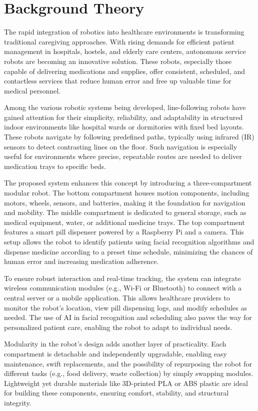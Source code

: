 \section{Background Theory}
The rapid integration of robotics into healthcare environments is transforming traditional caregiving approaches. With rising demands for efficient patient management in hospitals, hostels, and elderly care centers, autonomous service robots are becoming an innovative solution. These robots, especially those capable of delivering medications and supplies, offer consistent, scheduled, and contactless services that reduce human error and free up valuable time for medical personnel.

Among the various robotic systems being developed, line-following robots have gained attention for their simplicity, reliability, and adaptability in structured indoor environments like hospital wards or dormitories with fixed bed layouts. These robots navigate by following predefined paths, typically using infrared (IR) sensors to detect contrasting lines on the floor. Such navigation is especially useful for environments where precise, repeatable routes are needed to deliver medication trays to specific beds.

The proposed system enhances this concept by introducing a three-compartment modular robot. The bottom compartment houses motion components, including motors, wheels, sensors, and batteries, making it the foundation for navigation and mobility. The middle compartment is dedicated to general storage, such as medical equipment, water, or additional medicine trays. The top compartment features a smart pill dispenser powered by a Raspberry Pi and a camera. This setup allows the robot to identify patients using facial recognition algorithms and dispense medicine according to a preset time schedule, minimizing the chances of human error and increasing medication adherence.

To ensure robust interaction and real-time tracking, the system can integrate wireless communication modules (e.g., Wi-Fi or Bluetooth) to connect with a central server or a mobile application. This allows healthcare providers to monitor the robot’s location, view pill dispensing logs, and modify schedules as needed. The use of AI in facial recognition and scheduling also paves the way for personalized patient care, enabling the robot to adapt to individual needs.

Modularity in the robot’s design adds another layer of practicality. Each compartment is detachable and independently upgradable, enabling easy maintenance, swift replacements, and the possibility of repurposing the robot for different tasks (e.g., food delivery, waste collection) by simply swapping modules. Lightweight yet durable materials like 3D-printed PLA or ABS plastic are ideal for building these components, ensuring comfort, stability, and structural integrity.

